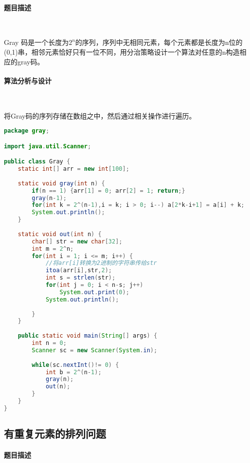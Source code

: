 \documentclass[UTF8]{ctexart}
\begin{document}
    \paragraph{题目描述}

    ~

    Gray 码是一个长度为$2^n$的序列，序列中无相同元素，每个元素都是长度为n位的(0,1)串，相邻元素恰好只有一位不同，用分治策略设计一个算法对任意的n构造相应的gray码。

   \paragraph{算法分析与设计}

   ~

   将Gray码的序列存储在数组之中，然后通过相关操作进行遍历。

\begin{small}
\begin{lstlisting}[language=java]
package gray;

import java.util.Scanner;

public class Gray {
	static int[] arr = new int[100];
	
	static void gray(int n) {
		if(n == 1) {arr[1] = 0; arr[2] = 1; return;}
		gray(n-1);
		for(int k = 2^(n-1),i = k; i > 0; i--) a[2*k-i+1] = a[i] + k;
		System.out.println();
	}
	
	static void out(int n) {
		char[] str = new char[32];
		int m = 2^n;
		for(int i = 1; i <= m; i++) {
			//将arr[i]转换为2进制的字符串传给str
			itoa(arr[i],str,2);
			int s = strlen(str);
			for(int j = 0; i < n-s; j++)
				System.out.print(0);
			System.out.println();
			
		}
	}
	
	public static void main(String[] args) {
		int n = 0;
		Scanner sc = new Scanner(System.in);
		
		while(sc.nextInt()!= 0) {
			int b = 2^(n-1);
			gray(n);
			out(n);
		}
	}
}
\end{lstlisting}
\end{small}

   \subsection{有重复元素的排列问题}
   \paragraph{题目描述}

   ~
\end{document}
